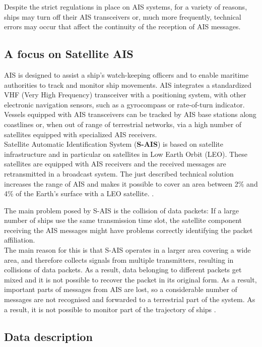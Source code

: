     Despite the strict regulations in place on AIS systems, for a variety of reasons, ships may turn off their AIS transceivers or, much more frequently, technical errors may occur that affect the continuity of the reception of AIS messages.
    
    \subsection{A focus on Satellite AIS}
    AIS is designed to assist a ship's watch-keeping officers and to enable maritime authorities to track and monitor ship movements. AIS integrates a standardized VHF (Very High Frequency) transceiver with a positioning system, with other electronic navigation sensors, such as a gyrocompass or rate-of-turn indicator. Vessels equipped with AIS transceivers can be tracked by AIS base stations along coastlines or, when out of range of terrestrial networks, via a high number of satellites equipped with specialized AIS receivers. 
    \\
    Satellite Automatic Identification System (\textbf{S-AIS}) is based on satellite infrastructure and in particular on satellites in Low Earth Orbit (LEO). These satellites are equipped with AIS receivers and the received messages are retransmitted in a broadcast system.
    The just described technical solution increases the range of AIS and makes it possible to cover an area between 2\% and 4\% of the Earth's surface with a LEO satellite. \cite{dbscan_ais}.
    
    The main problem posed by S-AIS is the collision of data packets: If a large number of ships use the same transmission time slot, the satellite component receiving the AIS messages might have problems correctly identifying the packet affiliation.
    \\
    The main reason for this is that S-AIS operates in a larger area covering a wide area, and therefore collects signals from multiple transmitters, resulting in collisions of data packets.
    As a result, data belonging to different packets get mixed and it is not possible to recover the packet in its original form. As a result, important parts of messages from AIS are lost, so a considerable number of messages are not recognised and forwarded to a terrestrial part of the system. As a result, it is not possible to monitor part of the trajectory of ships \cite{dbscan_ais}.

    \subsection{Data description}


